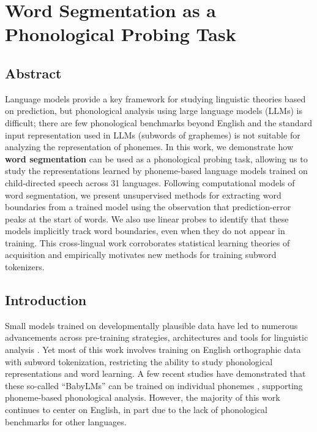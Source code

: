 \chapter{Word Segmentation as a Phonological Probing Task}\label{chapter:phonology}

\section{Abstract}

Language models provide a key framework for studying linguistic theories based on prediction, but phonological analysis using large language models (LLMs) is difficult; there are few phonological benchmarks beyond English and the standard input representation used in LLMs (subwords of graphemes) is not suitable for analyzing the representation of phonemes. In this work, we demonstrate how \textbf{word segmentation} can be used as a phonological probing task, allowing us to study the representations learned by phoneme-based language models trained on child-directed speech across 31 languages. Following computational models of word segmentation, we present unsupervised methods for extracting word boundaries from a trained model using the observation that prediction-error peaks at the start of words. We also use linear probes to identify that these models implicitly track word boundaries, even when they do not appear in training. 
This cross-lingual work corroborates statistical learning theories of acquisition and empirically motivates new methods for training subword tokenizers.



\section{Introduction}

Small models trained on developmentally plausible data have led to numerous advancements across pre-training strategies, architectures and tools for linguistic analysis \citep{hu-etal-2024-findings}. Yet most of this work involves training on English orthographic data with subword tokenization, restricting the ability to study phonological representations and word learning. A few recent studies have demonstrated that these so-called ``BabyLMs'' can be trained on individual phonemes \citep{goriely2024babble, bunzeck2024graphemes}, supporting phoneme-based phonological analysis. However, the majority of this work continues to center on English, in part due to the lack of phonological benchmarks for other languages.

